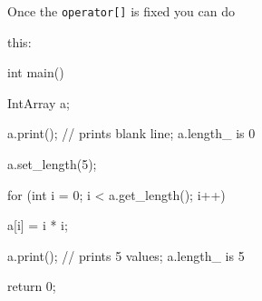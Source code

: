 Once the \texttt{operator[]} is fixed you can do

this:



\begin{consolethree}[escapeinside=||]

int main()

{

    IntArray a;

    a.print(); // prints blank line; a.length_ is 0

    a.set_length(5);

    for (int i = 0; i < a.get_length(); i++)

    {

        a[i] = i * i;

    }

    a.print(); // prints 5 values; a.length_ is 5

    return 0;

}

\end{consolethree}

